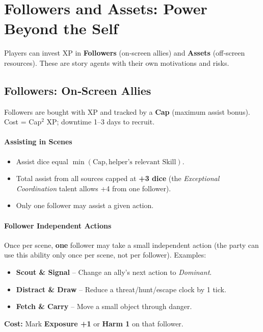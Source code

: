 \section{Followers and Assets: Power Beyond the Self}
\label{sec:followers-assets-gm}

Players can invest XP in \textbf{Followers} (on‑screen allies) and \textbf{Assets} (off‑screen resources). These are story agents with their own motivations and risks.

\subsection{Followers: On‑Screen Allies}
\label{subsec:followers-gm}

Followers are bought with XP and tracked by a \textbf{Cap} (maximum assist bonus). Cost = Cap\(^2\) XP; downtime 1–3 days to recruit.

\paragraph{Assisting in Scenes}
\begin{itemize}
  \item Assist dice equal \(\min(\text{Cap}, \text{helper’s relevant Skill})\).
  \item Total assist from all sources capped at \textbf{+3 dice} (the \textit{Exceptional Coordination} talent allows +4 from one follower).
  \item Only one follower may assist a given action.
\end{itemize}

\paragraph{Follower Independent Actions}
Once per scene, \textbf{one} follower may take a small independent action (the party can use this ability only once per scene, not per follower). Examples:
\begin{itemize}
  \item \textbf{Scout \& Signal} – Change an ally’s next action to \textit{Dominant}.
  \item \textbf{Distract \& Draw} – Reduce a threat/hunt/escape clock by 1 tick.
  \item \textbf{Fetch \& Carry} – Move a small object through danger.
\end{itemize}
\textbf{Cost:} Mark \textbf{Exposure +1} or \textbf{Harm 1} on that follower.

